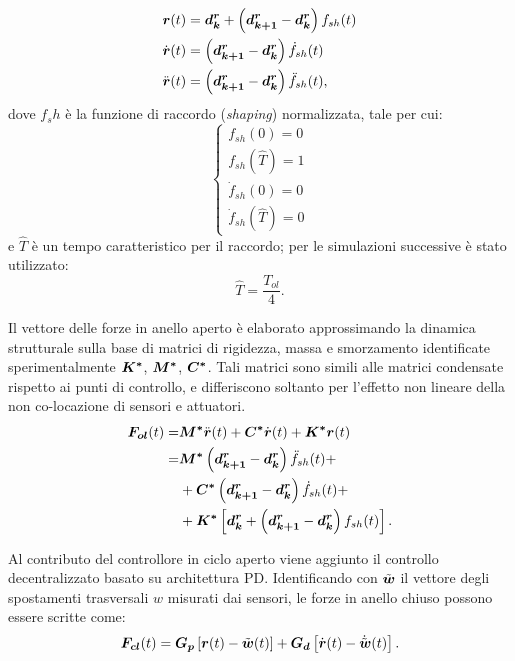 \begin{align}
\label{eq:7ff1}
\boldsymbol{r}(t) &= \boldsymbol{d_k^r}+\left(\boldsymbol{d_{k+1}^r} -\boldsymbol{d_k^r}\right)f_{sh}(t)\\
\label{eq:7ff1.0}
\dot{\boldsymbol{r}}(t) &= \left(\boldsymbol{d_{k+1}^r} -\boldsymbol{d_k^r}\right)\dot{f}_{sh}(t)\\
\label{eq:7ff1.1}
\ddot{\boldsymbol{r}}(t) &= \left(\boldsymbol{d_{k+1}^r} -\boldsymbol{d_k^r}\right)\ddot{f}_{sh}(t),
\end{align}
dove $f_sh$ è la funzione di raccordo (\textit{shaping}) normalizzata, tale per cui:
\begin{equation}
\label{eq:7ff2}
\left\{\begin{array}{c}
f_{sh}(0) = 0\\
f_{sh}(\hat{T}) = 1\\
\dot{f}_{sh}(0) = 0\\
\dot{f}_{sh}(\hat{T}) = 0
\end{array}\right.
\end{equation}
e $\hat{T}$ è un tempo caratteristico per il raccordo; per le simulazioni successive è stato utilizzato:
\begin{equation}
\label{eq:7ff3}
\hat{T} = \frac{T_{ol}}{4}.
\end{equation}

Il vettore delle forze in anello aperto è elaborato approssimando la dinamica strutturale sulla base di matrici di rigidezza, massa e smorzamento identificate sperimentalmente $\boldsymbol{K^*}$, $\boldsymbol{M^*}$, $\boldsymbol{C^*}$. Tali matrici sono  simili alle matrici condensate rispetto ai punti di controllo, e differiscono soltanto per l'effetto non lineare della non co-locazione di sensori e attuatori.
\begin{align}
\label{eq:7ff4}
\boldsymbol{F_{ol}}(t) =& \boldsymbol{M^*}\ddot{\boldsymbol{r}}(t)+\boldsymbol{C^*}\dot{\boldsymbol{r}}(t)+\boldsymbol{K^*}\boldsymbol{r}(t)\nonumber\\
=& \boldsymbol{M^*}\left(\boldsymbol{d_{k+1}^r} -\boldsymbol{d_k^r}\right)\ddot{f}_{sh}(t)+\nonumber\\
&+\boldsymbol{C^*}\left(\boldsymbol{d_{k+1}^r} -\boldsymbol{d_k^r}\right)\dot{f}_{sh}(t)+\nonumber\\
&+\boldsymbol{K^*}\left[\boldsymbol{d_k^r}+\left(\boldsymbol{d_{k+1}^r} -\boldsymbol{d_k^r}\right)f_{sh}(t)\right].
\end{align}

 
Al contributo del controllore in ciclo aperto viene aggiunto il controllo decentralizzato basato su architettura PD. Identificando con $\tilde{\boldsymbol{w}}$ il vettore degli spostamenti trasversali $w$ misurati dai sensori, le forze in anello chiuso possono essere scritte come:
\begin{align}
\label{eq:7fb1}
\boldsymbol{F_{cl}}(t) = \boldsymbol{G_p}\left[\boldsymbol{r}(t)-\tilde{\boldsymbol{w}}(t)\right]+ \boldsymbol{G_d}\left[\dot{\boldsymbol{r}}(t)-\dot{\tilde{\boldsymbol{w}}}(t)\right].
\end{align}


